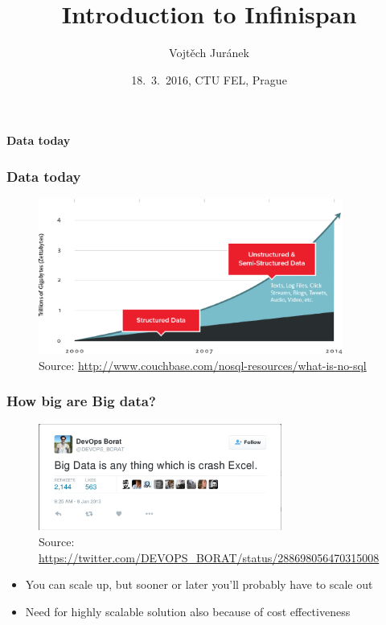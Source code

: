 \documentclass[10pt,utf8]{beamer}
\title{Introduction to Infinispan}
\author{Vojtěch Juránek}
\institute[Red Hat]{JBoss - a division by Red Hat}
\date{18.~3.~2016, CTU FEL, Prague}
\begin{document}


\begin{frame}
 \titlepage
\end{frame}

\begin{frame}
	\centering
	\huge{\textbf{Data today}}
\end{frame}


\begin{frame}
	\frametitle{Data today}
	\begin{figure}
		\centering
		\includegraphics[width=10cm]{./img/why-nosql-2.eps}
		\caption{\tiny{Source: \url{http://www.couchbase.com/nosql-resources/what-is-no-sql}}}
	\end{figure}
\end{frame}

\begin{frame}
	\frametitle{How big are Big data?}
	 {
		\begin{figure}
			\centering
			\includegraphics[width=8cm]{./img/borat_big_data.eps}
			\caption{\tiny{Source: \url{https://twitter.com/DEVOPS\_BORAT/status/288698056470315008}}}
		\end{figure}
	}
	 {
		\begin{itemize}
			\item You can scale up, but sooner or later you'll probably have to scale out
			\item Need for highly scalable solution also because of cost effectiveness
		\end{itemize}
	}
\end{frame}
\end{document}
